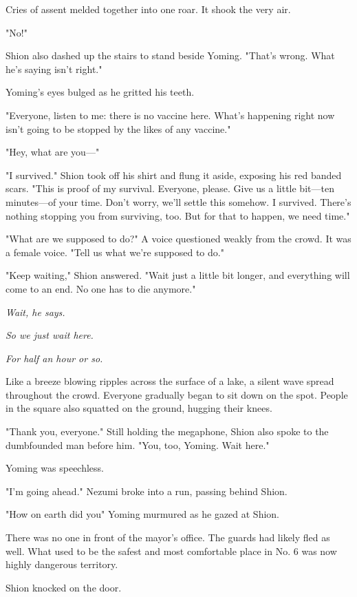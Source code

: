 Cries of assent melded together into one roar. It shook the very air.

"No!"

Shion also dashed up the stairs to stand beside Yoming. "That's wrong.
What he's saying isn't right."

Yoming's eyes bulged as he gritted his teeth.

"Everyone, listen to me: there is no vaccine here. What's happening
right now isn't going to be stopped by the likes of any vaccine."

"Hey, what are you---"

"I survived." Shion took off his shirt and flung it aside, exposing his
red banded scars. "This is proof of my survival. Everyone, please. Give
us a little bit---ten minutes---of your time. Don't worry, we'll settle this
somehow. I survived. There's nothing stopping you from surviving, too.
But for that to happen, we need time."

"What are we supposed to do?" A voice questioned weakly from the crowd.
It was a female voice. "Tell us what we're supposed to do."

"Keep waiting," Shion answered. "Wait just a little bit longer, and
everything will come to an end. No one has to die anymore."

\emph{Wait, he says.}

\emph{So we just wait here.}

\emph{For half an hour or so.}

Like a breeze blowing ripples across the surface of a lake, a silent
wave spread throughout the crowd. Everyone gradually began to sit down
on the spot. People in the square also squatted on the ground, hugging
their knees.

"Thank you, everyone." Still holding the megaphone, Shion also spoke to
the dumbfounded man before him. "You, too, Yoming. Wait here."

Yoming was speechless.

"I'm going ahead." Nezumi broke into a run, passing behind Shion.

"How on earth did you\el " Yoming murmured as he gazed at Shion.

\mybreak

There was no one in front of the mayor's office. The guards had likely
fled as well. What used to be the safest and most comfortable place in
No. 6 was now highly dangerous territory.

Shion knocked on the door.

